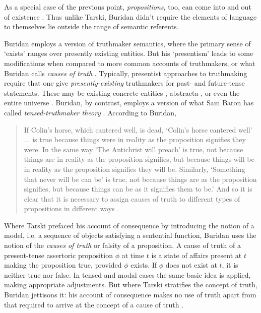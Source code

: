 \documentclass[]{article}
\begin{document}
As a special case of the previous point, \textit{propositions}, too, can come into and out of existence \autocite{Klima2004} \autocite{DutilhNovaes2005}. Thus unlike Tarski, Buridan didn't require the elements of language to themselves lie outside the range of semantic referents.

Buridan employs a version of truthmaker semantics, where the primary sense of `exists' ranges over presently existing entities. But his `presentism' leads to some modifications when compared to more common accounts of truthmakers, or what Buridan calls \textit{causes of truth} \autocite[I. 1]{Buridan2015}. Typically, presentist approaches to truthmaking require that one give \textit{presently-existing} truthmakers for past- and future-tense statements. These may be existing concrete entities \autocite{Cameron2008} \autocite{Cameron2011} \autocite{Cameron2013}, abstracta \autocite{Crisp2007}, or even the entire universe \autocite{Bigelow1996}. Buridan, by contrast, employs a version of what Sam Baron has called \textit{tensed-truthmaker theory} \autocite{Baron2015}. According to Buridan,
\begin{quote}
	If Colin's horse, which cantered well, is dead, `Colin's horse cantered well' ... is true because things were in reality as the proposition signifies they were. In the same way `The Antichrist will preach' is true, not because things are in reality as the proposition signifies, but because things will be in reality as the proposition signifies they will be. Similarly, `Something that never will be can be' is true, not because things are as the proposition signifies, but because things can be as it signifies them to be.' And so it is clear that it is necessary to assign causes of truth to different types of propositions in different ways \autocite[I. 1, 63]{Buridan2015}.
\end{quote}

Where Tarski prefaced his account of consequence by introducing the notion of a model, i.e. a sequence of objects satisfying a sentential function, Buridan uses the notion of the \textit{causes of truth} or falsity of a proposition. A cause of truth of a present-tense assertoric proposition $\phi$ at time $t$ is a state of affairs present at $t$ making the proposition true, provided $\phi$ exists. If $\phi$ does not exist at $t$, it is neither true nor false. In tensed and modal cases the same basic idea is applied, making appropriate adjustments. But where Tarski stratifies the concept of truth, Buridan jettisons it: his account of consequence makes no use of truth apart from that required to arrive at the concept of a cause of truth \autocite{Klima2008}.
\end{document}
